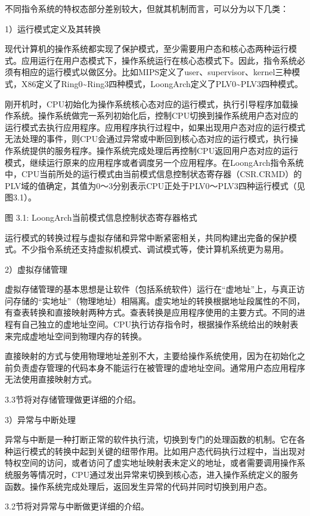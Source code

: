 \documentclass[]{ctexbook}
\begin{document}
不同指令系统的特权态部分差别较大，但就其机制而言，可以分为以下几类：

1）运行模式定义及其转换

现代计算机的操作系统都实现了保护模式，至少需要用户态和核心态两种运行模式。应用运行在用户态模式下，操作系统运行在核心态模式下。因此，指令系统必须有相应的运行模式以做区分。比如MIPS定义了user、supervisor、kernel三种模式，X86定义了Ring0\textasciitilde Ring3四种模式，LoongArch定义了PLV0\textasciitilde PLV3四种模式。

刚开机时，CPU初始化为操作系统核心态对应的运行模式，执行引导程序加载操作系统。操作系统做完一系列初始化后，控制CPU切换到操作系统用户态对应的运行模式去执行应用程序。应用程序执行过程中，如果出现用户态对应的运行模式无法处理的事件，则CPU会通过异常或中断回到核心态对应的运行模式，执行操作系统提供的服务程序。操作系统完成处理后再控制CPU返回用户态对应的运行模式，继续运行原来的应用程序或者调度另一个应用程序。在LoongArch指令系统中，CPU当前所处的运行模式由当前模式信息控制状态寄存器（CSR.CRMD）的PLV域的值确定，其值为0～3分别表示CPU正处于PLV0～PLV3四种运行模式（见图3.1）。

图 3.1: LoongArch当前模式信息控制状态寄存器格式

运行模式的转换过程与虚拟存储和异常中断紧密相关，共同构建出完备的保护模式。不少指令系统还支持虚拟机模式、调试模式等，使计算机系统更为易用。

2）虚拟存储管理

虚拟存储管理的基本思想是让软件（包括系统软件）运行在``虚地址''上，与真正访问存储的``实地址''（物理地址）相隔离。虚实地址的转换根据地址段属性的不同，有查表转换和直接映射两种方式。查表转换是应用程序使用的主要方式。不同的进程有自己独立的虚地址空间。CPU执行访存指令时，根据操作系统给出的映射表来完成虚地址空间到物理内存的转换。

直接映射的方式与使用物理地址差别不大，主要给操作系统使用，因为在初始化之前负责虚存管理的代码本身不能运行在被管理的虚地址空间。通常用户态应用程序无法使用直接映射方式。

3.3节将对存储管理做更详细的介绍。

3）异常与中断处理

异常与中断是一种打断正常的软件执行流，切换到专门的处理函数的机制。它在各种运行模式的转换中起到关键的纽带作用。比如用户态代码执行过程中，当出现对特权空间的访问，或者访问了虚实地址映射表未定义的地址，或者需要调用操作系统服务等情况时，CPU通过发出异常来切换到核心态，进入操作系统定义的服务函数。操作系统完成处理后，返回发生异常的代码并同时切换到用户态。

3.2节将对异常与中断做更详细的介绍。
\end{document}
